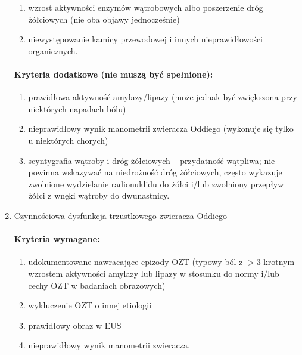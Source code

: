 \begin{enumerate}
\begin{enumerate}
    \item wzrost aktywności enzymów wątrobowych albo poszerzenie dróg żółciowych (nie oba objawy jednocześnie)

    \item niewystępowanie kamicy przewodowej i innych nieprawidłowości organicznych.
\end{enumerate}

\paragraph{Kryteria dodatkowe (nie muszą być spełnione):}

\begin{enumerate}
    \item prawidłowa aktywność amylazy/lipazy (może jednak być zwiększona przy niektórych napadach bólu)

    \item nieprawidłowy wynik manometrii zwieracza Oddiego (wykonuje się tylko u niektórych chorych)

    \item scyntygrafia wątroby i dróg żółciowych – przydatność wątpliwa; nie powinna wskazywać na niedrożność dróg żółciowych, często wykazuje zwolnione wydzielanie radionuklidu do żółci i/lub zwolniony przepływ żółci z wnęki wątroby do dwunastnicy.
\end{enumerate}

\item Czynnościowa dysfunkcja trzustkowego zwieracza Oddiego

\paragraph{Kryteria wymagane:}

\begin{enumerate}
    \item udokumentowane nawracające epizody OZT (typowy ból z $>$3-krotnym wzrostem aktywności amylazy lub lipazy w stosunku do normy i/lub cechy OZT w badaniach obrazowych)

    \item wykluczenie OZT o innej etiologii

    \item prawidłowy obraz w EUS

    \item nieprawidłowy wynik manometrii zwieracza.
\end{enumerate}
\end{enumerate}


